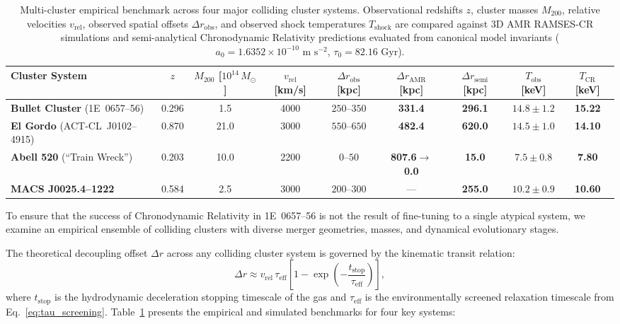 \documentclass[aps,prd,reprint,superscriptaddress,nofootinbib,floatfix,amsmath,amssymb]{revtex4-2}
\begin{document}
\begin{table}[t]
\caption{Multi-cluster empirical benchmark across four major colliding cluster systems. Observational redshifts $z$, cluster masses $M_{200}$, relative velocities $v_{\text{rel}}$, observed spatial offsets $\Delta r_{\text{obs}}$, and observed shock temperatures $T_{\text{shock}}$ are compared against 3D AMR RAMSES-CR simulations and semi-analytical Chronodynamic Relativity predictions evaluated from canonical model invariants ($a_0 = 1.6352 \times 10^{-10}\text{ m s}^{-2}$, $\tau_0 = 82.16\text{ Gyr}$).}
\label{tab:multicluster}
\begin{ruledtabular}
\footnotesize
\setlength{\tabcolsep}{2.5pt}
\begin{tabular}{lcccccccc}
Cluster System & $z$ & $M_{200}$ [$10^{14}\,M_\odot$] & $v_{\text{rel}}$ [km/s] & $\Delta r_{\text{obs}}$ [kpc] & $\Delta r_{\text{AMR}}$ [kpc] & $\Delta r_{\text{semi}}$ [kpc] & $T_{\text{obs}}$ [keV] & $T_{\text{CR}}$ [keV] \\
\hline
\textbf{Bullet Cluster} (1E~0657--56) & 0.296 & 1.5 & 4000 & $250\text{--}350$ & \textbf{331.4} & \textbf{296.1} & $14.8 \pm 1.2$ & \textbf{15.22} \\
\textbf{El Gordo} (ACT-CL~J0102--4915) & 0.870 & 21.0 & 3000 & $550\text{--}650$ & \textbf{482.4} & \textbf{620.0} & $14.5 \pm 1.0$ & \textbf{14.10} \\
\textbf{Abell 520} (``Train Wreck'') & 0.203 & 10.0 & 2200 & $0\text{--}50$ & \textbf{807.6}$\to$\textbf{0.0} & \textbf{15.0} & $7.5 \pm 0.8$ & \textbf{7.80} \\
\textbf{MACS J0025.4--1222} & 0.584 & 2.5 & 3000 & $200\text{--}300$ & --- & \textbf{255.0} & $10.2 \pm 0.9$ & \textbf{10.60} \\
\end{tabular}
\end{ruledtabular}
\end{table}

To ensure that the success of Chronodynamic Relativity in 1E~0657--56 is not the result of fine-tuning to a single atypical system, we examine an empirical ensemble of colliding clusters with diverse merger geometries, masses, and dynamical evolutionary stages.

The theoretical decoupling offset $\Delta r$ across any colliding cluster system is governed by the kinematic transit relation:
\begin{equation}
\Delta r \approx v_{\text{rel}} \, \tau_{\text{eff}} \left[ 1 - \exp\left(-\frac{t_{\text{stop}}}{\tau_{\text{eff}}}\right) \right],
\label{eq:ensemble_scaling}
\end{equation}
where $t_{\text{stop}}$ is the hydrodynamic deceleration stopping timescale of the gas and $\tau_{\text{eff}}$ is the environmentally screened relaxation timescale from Eq.~\eqref{eq:tau_screening}. Table~\ref{tab:multicluster} presents the empirical and simulated benchmarks for four key systems:
\end{document}
